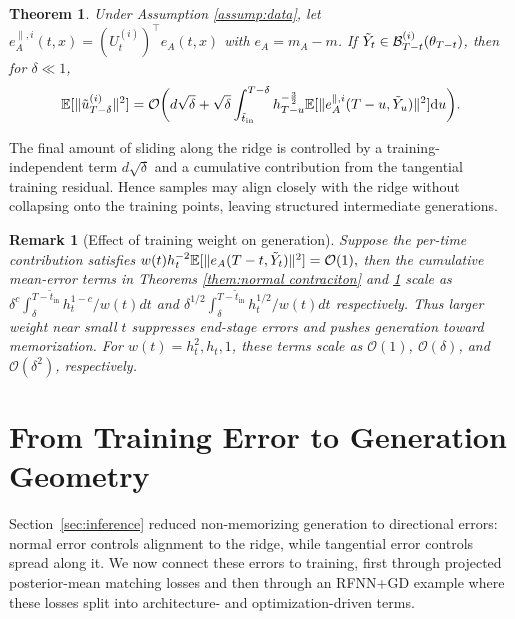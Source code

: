 \documentclass[11pt]{article}
\newcommand{\mb}{\mathbb}
\newcommand{\dee}{\mathrm{d}}
\newcommand{\mc}{\mathcal}
\newtheorem{theorem}{Theorem}[section]
\newtheorem{remark}{Remark}[section]
\begin{document}
\begin{theorem}\label{them:tangent contraciton} Under Assumption \ref{assump:data}, let $e_A^{\parallel,i}(t,x)=(U_{t}^{(i)})^\intercal e_A(t,x)$ with $e_A=m_A-m$. If $\Tilde{Y}_t\in \mc{B}_{T-t}^{(i)}(\theta_{T-t})$,  then for $\delta\ll 1$, 
\begin{align*}
     \mb{E}[\| \Tilde{u}_{T-\delta}^{(i)} \|^2] = \mc{O}\bigg( d\sqrt{\delta} + \sqrt{\delta} \int_{\Tilde{t}_{\mathrm{in}}}^{T-\delta}  h_{T-u}^{-\frac{3}{2}}{\mb{E}[\|e_A^{\parallel,i}(T-u,\Tilde{Y}_{u}) \|^2]} \dee u  \bigg). 
\end{align*}
\end{theorem}
The final amount of sliding along the ridge is controlled by a training-independent term $d\sqrt{\delta}$ and a cumulative contribution from the tangential training residual. Hence samples may align closely with the ridge without collapsing onto the training points, leaving structured intermediate generations.
\begin{remark}[Effect of training weight on generation]\label{rem:effect_of_weight}
Suppose the per-time contribution satisfies 
$w(t)h_t^{-2} \mathbb{E}[\|e_A(T-t,\Tilde{Y}_t)\|^2]=\mathcal{O}(1),
$
then the cumulative mean-error terms in Theorems \ref{them:normal contraciton} and \ref{them:tangent contraciton} scale as
$
\delta^{c}\int_{\delta}^{T-\tilde t_{\mathrm{in}}}{h_t^{1-c}}/{w(t)}dt $ and $ \delta^{1/2}\int_{\delta}^{T-\tilde t_{\mathrm{in}}}{h_t^{1/2}}/{w(t)}dt
$
respectively. Thus larger weight near small $t$ suppresses end-stage errors and pushes generation toward memorization. For $w(t)=h_t^2,h_t,1$, these terms scale as
$\mathcal{O}(1)$, $\mathcal{O}(\delta)$, and $\mathcal{O}(\delta^2)$, respectively.
\end{remark}

\section{From Training Error to Generation Geometry}\label{sec:training to inference} 
Section~\ref{sec:inference} reduced non-memorizing generation to directional errors: normal error controls alignment to the ridge, while tangential error controls spread along it. We now connect these errors to training, first through projected posterior-mean matching losses and then through an RFNN+GD example where these losses split into architecture- and optimization-driven terms.
\end{document}
